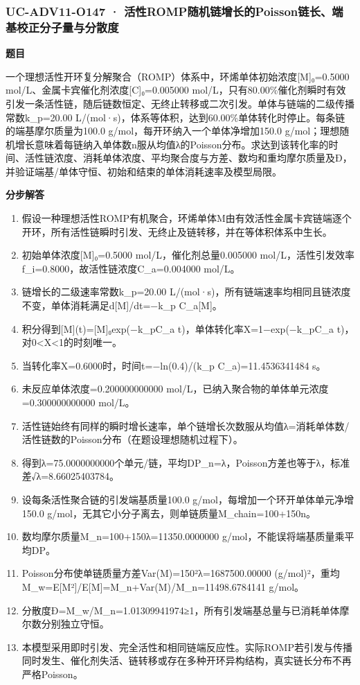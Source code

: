\documentclass[UTF8,11pt,a4paper]{ctexart}
\begin{document}
\subsubsection*{UC-ADV11-O147 · 活性ROMP随机链增长的Poisson链长、端基校正分子量与分散度}
\noindent\textbf{题目}\par
一个理想活性开环复分解聚合（ROMP）体系中，环烯单体初始浓度[M]₀=0.5000 mol/L、金属卡宾催化剂浓度[C]₀=0.005000 mol/L，只有80.00\%催化剂瞬时有效引发一条活性链，随后链数恒定、无终止转移或二次引发。单体与链端的二级传播常数k\_p=20.00 L/(mol·s)，体系等体积，达到60.00\%单体转化时停止。每条链的端基摩尔质量为100.0 g/mol，每开环纳入一个单体净增加150.0 g/mol；理想随机增长意味着每链纳入单体数n服从均值λ的Poisson分布。求达到该转化率的时间、活性链浓度、消耗单体浓度、平均聚合度与方差、数均和重均摩尔质量及Đ，并验证端基/单体守恒、初始和结束的单体消耗速率及模型局限。\par
\medskip\noindent\textbf{分步解答}
\begin{enumerate}
\item 假设一种理想活性ROMP有机聚合，环烯单体M由有效活性金属卡宾链端逐个开环，所有活性链瞬时引发、无终止及链转移，并在等体积体系中生长。
\item 初始单体浓度[M]₀=0.5000 mol/L，催化剂总量0.005000 mol/L，活性引发效率f\_i=0.8000，故活性链浓度C\_a=0.004000 mol/L。
\item 链增长的二级速率常数k\_p=20.00 L/(mol·s)，所有链端速率均相同且链浓度不变，单体消耗满足d[M]/dt=−k\_p C\_a[M]。
\item 积分得到[M](t)=[M]₀exp(−k\_pC\_a t)，单体转化率X=1−exp(−k\_pC\_a t)，对0<X<1的时刻唯一。
\item 当转化率X=0.6000时，时间t=−ln(0.4)/(k\_p C\_a)=11.4536341484 s。
\item 未反应单体浓度=0.200000000000 mol/L，已纳入聚合物的单体单元浓度=0.300000000000 mol/L。
\item 活性链始终有同样的瞬时增长速率，单个链增长次数服从均值λ=消耗单体数/活性链数的Poisson分布（在题设理想随机过程下）。
\item 得到λ=75.0000000000个单元/链，平均DP\_n=λ，Poisson方差也等于λ，标准差√λ=8.66025403784。
\item 设每条活性聚合链的引发端基质量100.0 g/mol，每增加一个环开单体单元净增150.0 g/mol，无其它小分子离去，则单链质量M\_chain=100+150n。
\item 数均摩尔质量M\_n=100+150λ=11350.0000000 g/mol，不能误将端基质量乘平均DP。
\item Poisson分布使单链质量方差Var(M)=150²λ=1687500.00000 (g/mol)²，重均M\_w=E[M²]/E[M]=M\_n+Var(M)/M\_n=11498.6784141 g/mol。
\item 分散度Đ=M\_w/M\_n=1.01309941974≥1，所有引发端基总量与已消耗单体摩尔数分别独立守恒。
\item 本模型采用即时引发、完全活性和相同链端反应性。实际ROMP若引发与传播同时发生、催化剂失活、链转移或存在多种开环异构结构，真实链长分布不再严格Poisson。
\end{enumerate}
\end{document}
